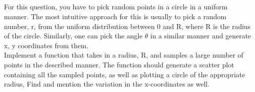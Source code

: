 \documentclass[answers]{exam}
\begin{document}
\subsection{} For this question, you have to pick random points in a circle in a uniform manner. The most intuitive approach for this is usually to pick a random number, r, from the uniform distribution between 0 and R, where R is the radius of the circle. Similarly, one can pick the angle $\theta$ in a similar manner and generate x, y coordinates from them. \\
Implement a function that takes in a radius, R, and samples a large number of points in the described manner. The function should generate a scatter plot containing all the sampled points, as well as plotting a circle of the appropriate radius, Find and mention the variation in the x-coordinates as well. \\ 
\end{document}
